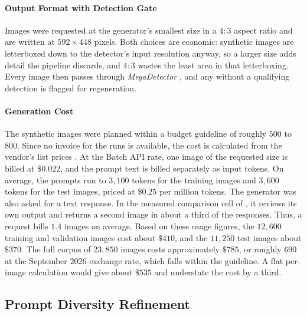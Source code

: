 \paragraph{Output Format with Detection Gate}
Images were requested at the generator's smallest size in a $4{:}3$ aspect ratio and are written at $592 \times 448$ pixels. Both choices are economic: synthetic images are letterboxed down to the detector's input resolution anyway, so a larger size adds detail the pipeline discards, and $4{:}3$ wastes the least area in that letterboxing. Every image then passes through \textit{MegaDetector} \cite{beeryEfficientPipelineCamera2019}, and any without a qualifying detection is flagged for regeneration.

\paragraph{Generation Cost}
The synthetic images were planned within a budget guideline of roughly \texteuro$500$ to \texteuro$800$.  %
Since no invoice for the runs is available, the cost is calculated from the vendor's list prices \cite{GeminiDeveloperAPI}. At the Batch API rate, one image of the requested size is billed at $\$0.022$, and the prompt text is billed separately as input tokens. On average, the prompts run to $3{,}100$ tokens for the training images and $3{,}600$ tokens for the test images, priced at $\$0.25$ per million tokens. The generator was also asked for a text response. In the measured comparison cell of , it reviews its own output and returns a second image in about a third of the responses. Thus, a request bills $1.4$ images on average. Based on these usage figures, the $12{,}600$ training and validation images cost about $\$410$, and the $11{,}250$ test images about $\$370$. The full corpus of $23{,}850$ images costs approximately $\$785$, or roughly \texteuro$690$ at the September 2026 exchange rate, which falls within the guideline. A flat per-image calculation would give about $\$535$ and understate the cost by a third.  %

\subsection{Prompt Diversity Refinement}\label{sec:prompt_diversity}

